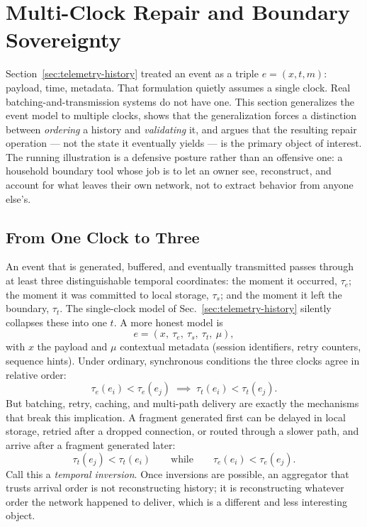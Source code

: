 \documentclass[12pt,a4paper]{article}
\theoremstyle{plain}
\theoremstyle{definition}
\theoremstyle{remark}
\begin{document}
\section{Multi-Clock Repair and Boundary Sovereignty}
\label{sec:multi-clock-repair}

Section~\ref{sec:telemetry-history} treated an event as a triple $e=(x,t,m)$: payload, time, metadata. That formulation quietly assumes a single clock. Real batching-and-transmission systems do not have one. This section generalizes the event model to multiple clocks, shows that the generalization forces a distinction between \emph{ordering} a history and \emph{validating} it, and argues that the resulting repair operation — not the state it eventually yields — is the primary object of interest. The running illustration is a defensive posture rather than an offensive one: a household boundary tool whose job is to let an owner see, reconstruct, and account for what leaves their own network, not to extract behavior from anyone else's.

\subsection{From One Clock to Three}
\label{subsec:three-clocks}

An event that is generated, buffered, and eventually transmitted passes through at least three distinguishable temporal coordinates: the moment it occurred, $\tau_e$; the moment it was committed to local storage, $\tau_s$; and the moment it left the boundary, $\tau_t$. The single-clock model of Sec.~\ref{sec:telemetry-history} silently collapses these into one $t$. A more honest model is
\[
e = (x,\ \tau_e,\ \tau_s,\ \tau_t,\ \mu),
\]
with $x$ the payload and $\mu$ contextual metadata (session identifiers, retry counters, sequence hints). Under ordinary, synchronous conditions the three clocks agree in relative order:
\[
\tau_e(e_i) < \tau_e(e_j) \;\implies\; \tau_t(e_i) < \tau_t(e_j).
\]
But batching, retry, caching, and multi-path delivery are exactly the mechanisms that break this implication. A fragment generated first can be delayed in local storage, retried after a dropped connection, or routed through a slower path, and arrive after a fragment generated later:
\[
\tau_t(e_j) < \tau_t(e_i) \qquad \text{while} \qquad \tau_e(e_i) < \tau_e(e_j).
\]
Call this a \emph{temporal inversion}. Once inversions are possible, an aggregator that trusts arrival order is not reconstructing history; it is reconstructing whatever order the network happened to deliver, which is a different and less interesting object.
\end{document}
